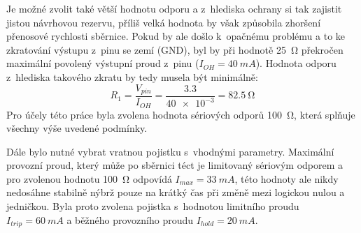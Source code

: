             Je možné zvolit také větší hodnotu odporu a z~hlediska ochrany si tak zajistit jistou návrhovou rezervu, příliš velká hodnota by však způsobila zhoršení přenosové rychlosti sběrnice. Pokud by ale došlo k~opačnému problému a to ke zkratování výstupu z~pinu se zemí (GND), byl by při hodnotě \qty{25}{\ohm} překročen maximální povolený výstupní proud z~pinu (\(I_{OH}=\qty{40}{mA}\)). Hodnota odporu z~hlediska takového zkratu by tedy musela být minimálně:
            \begin{equation}
                R_{1} =\frac{V_{pin}}{I_{OH} }=\frac{\num{3.3}}{\num{40e-3}}=\qty{82.5}{\ohm}
            \end{equation}
            Pro účely této práce byla zvolena hodnota sériových odporů \qty{100}{\ohm}, která splňuje všechny výše uvedené podmínky.

            Dále bylo nutné vybrat vratnou pojistku s~vhodnými parametry. Maximální provozní proud, který může po sběrnici téct je limitovaný sériovým odporem a pro zvolenou hodnotu \qty{100}{\ohm} odpovídá \(I_{max} =\qty{33}{mA}\), této hodnoty ale nikdy nedosáhne stabilně nýbrž pouze na krátký čas při změně mezi logickou nulou a jedničkou. Byla proto zvolena pojistka s~hodnotou limitního proudu \(I_{trip} =\qty{60}{mA}\) a běžného provozního proudu \(I_{hold} =\qty{20}{mA}\). 

            

            